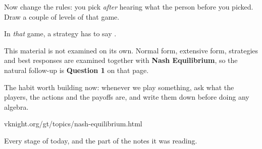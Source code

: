 {\large Now change the rules: you pick \emph{after} hearing what the person
before you picked. Draw a couple of levels of that game.}

\vspace{0.7cm}

\begin{center}
\end{center}

\vspace{0.5cm}

{\large In \emph{that} game, a strategy has to say
 .}

\newpage
{}

\vspace{0.9cm}

{\large This material is not examined on its own. Normal form, extensive form,
strategies and best responses are examined together with \textbf{Nash
Equilibrium}, so the natural follow-up is \textbf{Question 1} on that page.}

\vspace{1.2cm}

{\large The habit worth building now: whenever we play something, ask what the
players, the actions and the payoffs are, and write them down before doing any
algebra.}

\vspace{1.6cm}

\begin{center}
{\large\color{inkgrey} vknight.org/gt/topics/nash-equilibrium.html}
\end{center}

\newpage
\nonotes
{}

\vspace{0.3cm}

{\large Every stage of today, and the part of the notes it was reading.}

\vspace{0.35cm}

